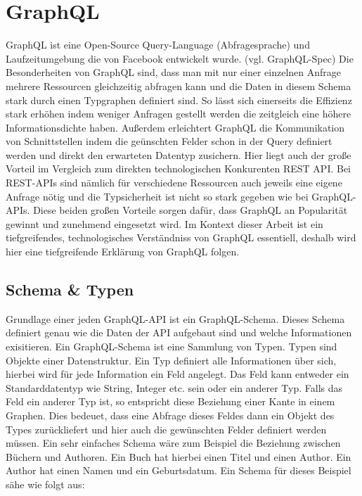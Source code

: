 \section{GraphQL}

GraphQL ist eine Open-Source Query-Language (Abfragesprache) und Laufzeitumgebung die von Facebook entwickelt wurde. (vgl. GraphQL-Spec)
Die Besonderheiten von GraphQL sind, dass man mit nur einer einzelnen Anfrage mehrere Ressourcen gleichzeitig abfragen kann und die
Daten in diesem Schema stark durch einen Typgraphen definiert sind. So lässt sich einerseits die Effizienz stark erhöhen indem weniger Anfragen
gestellt werden die zeitgleich eine höhere Informationsdichte haben.
Außerdem erleichtert GraphQL die Kommunikation von Schnittstellen indem die geünschten Felder schon in der Query definiert werden
und direkt den erwarteten Datentyp zusichern.
Hier liegt auch der große Vorteil im Vergleich zum direkten technologischen Konkurenten REST API.
Bei REST-APIs sind nämlich für verschiedene Ressourcen auch jeweils eine eigene Anfrage nötig und die Typsicherheit ist nicht so stark gegeben
wie bei GraphQL-APIs.
Diese beiden großen Vorteile sorgen dafür, dass GraphQL an Popularität gewinnt und zunehmend eingesetzt wird.
Im Kontext dieser Arbeit ist ein tiefgreifendes, technologisches Verständniss von GraphQL essentiell, deshalb wird hier
eine tiefgreifende Erklärung von GraphQL folgen.

\subsection{Schema \& Typen}

Grundlage einer jeden GraphQL-API ist ein GraphQL-Schema.
Dieses Schema definiert genau wie die Daten der API aufgebaut sind und welche Informationen exisitieren.
Ein GraphQL-Schema ist eine Sammlung von Typen.
Typen sind Objekte einer Datenstruktur.
Ein Typ definiert alle Informationen über sich, hierbei wird für jede Information ein Feld angelegt.
Das Feld kann entweder ein Standarddatentyp wie String, Integer etc. sein oder ein anderer Typ.
Falls das Feld ein anderer Typ ist, so entspricht diese Beziehung einer Kante in einem Graphen.
Dies bedeuet, dass eine Abfrage dieses Feldes dann ein Objekt des Types zurückliefert und hier auch die gewünschten Felder
definiert werden müssen.
Ein sehr einfaches Schema wäre zum Beispiel die Beziehung zwischen Büchern und Authoren.
Ein Buch hat hierbei einen Titel und einen Author.
Ein Author hat einen Namen und ein Geburtsdatum.
Ein Schema für dieses Beispiel sähe wie folgt aus:


